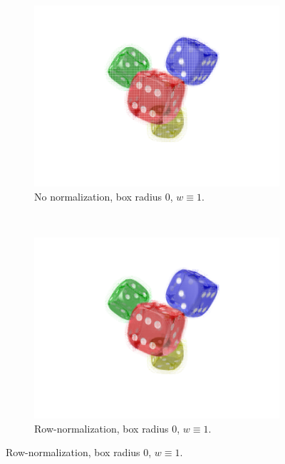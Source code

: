 \documentclass[11pt,a4paper,titlepage]{article}
\begin{document}
\begin{figure}[h]
	\centering
	\begin{subfigure}[t]{0.45\textwidth}
 		\includegraphics[width=\textwidth]{results/aliasing_fixes/compare_normalization/no_normalization_r=0_weights=1/central_view_reconstruction2-2.png} 
  		\caption{No normalization, box radius $0$, $w \equiv 1$.}
	\end{subfigure}%
	~
	\begin{subfigure}[t]{0.45\textwidth}
		\includegraphics[width=\textwidth]{results/aliasing_fixes/compare_normalization/normalization_r=0_weights=1/central_view_reconstruction2-2.png} 
		\caption{Row-normalization, box radius $0$, $w \equiv 1$.}
		\label{fig:normalization_no_weights}
	\end{subfigure}%

\end{figure}
\end{document}
